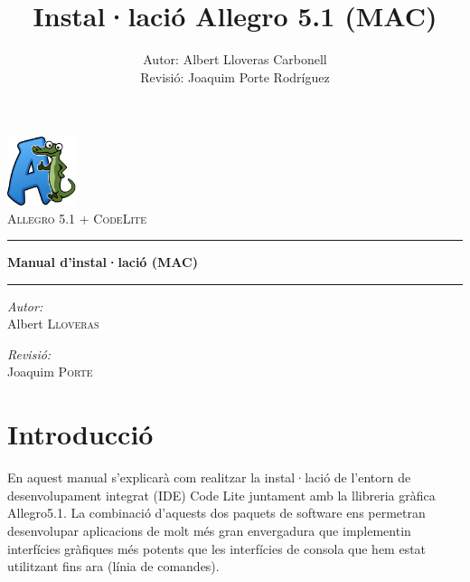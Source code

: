 \documentclass[11pt]{article}
\title{Instal·lació Allegro 5.1 (MAC)}
\author{Autor: Albert Lloveras Carbonell\\Revisió: Joaquim Porte Rodríguez}
\date{}
\begin{document}
\pagestyle{empty}
\begin{center}

	\includegraphics[width=0.15\textwidth]{img/allegro.png}~\\[1cm]
	
	\textsc{\LARGE Allegro 5.1 + CodeLite}\\[1.5cm]
	
	\hrule
	\vspace{8pt}
	\huge{\bfseries Manual d'instal·lació (MAC)}
	\vspace{8pt}
	\hrule	
	\vspace{12pt	}

	\noindent
	\begin{minipage}{0.4\textwidth}
		\begin{flushleft} \large
			\emph{Autor:}\\
			Albert \textsc{Lloveras}
		\end{flushleft}
	\end{minipage}%
	\begin{minipage}{0.4\textwidth}
		\begin{flushright} \large
			\emph{Revisió:} \\
			Joaquim \textsc{Porte}
		\end{flushright}
	\end{minipage}
	\vfill

\end{center}

\newpage

\pagestyle{empty}
\tableofcontents


\newpage
\pagestyle{pageStyle}

\section{Introducció}
En aquest manual s'explicarà com realitzar la instal·lació de l'entorn de desenvolupament integrat (IDE) Code Lite juntament amb la llibreria gràfica Allegro5.1. La combinació d'aquests dos paquets de software ens permetran desenvolupar aplicacions de molt més gran envergadura que implementin interfícies gràfiques més potents que les interfícies de consola que hem estat utilitzant fins ara (línia de comandes).
\end{document}
